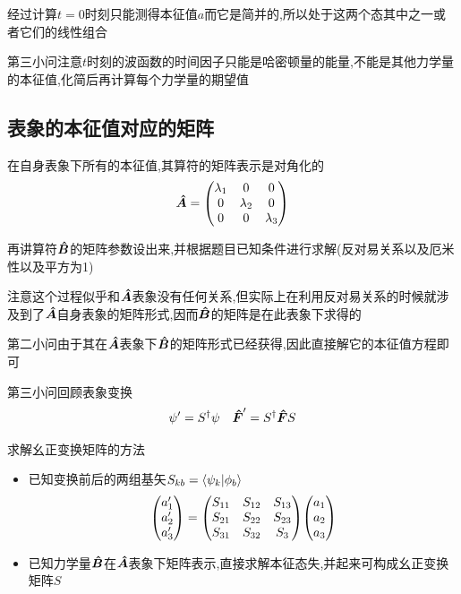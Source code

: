 \documentclass{article}
\begin{document}
            经过计算$t=0$时刻只能测得本征值$a$而它是简并的,所以处于这两个态其中之一或者它们的线性组合

            第三小问注意$t$时刻的波函数的时间因子只能是哈密顿量的能量,不能是其他力学量的本征值,化简后再计算每个力学量的期望值
        \subsection{表象的本征值对应的矩阵}
            \begin{formal}
                在自身表象下所有的本征值,其算符的矩阵表示是对角化的
                $$ \vu*{A} = \mqty (\lambda_{1} & 0 & 0 \\ 0 & \lambda_{2} & 0 \\ 0 & 0 & \lambda_{3}) $$
            \end{formal}
        
            再讲算符$\vu*{B}$的矩阵参数设出来,并根据题目已知条件进行求解(反对易关系以及厄米性以及平方为1)

            注意这个过程似乎和$\vu*{A}$表象没有任何关系,但实际上在利用反对易关系的时候就涉及到了$\vu*{A}$自身表象的矩阵形式,因而$\vu*{B}$的矩阵是在此表象下求得的

            第二小问由于其在$\vu*{A}$表象下$\vu*{B}$的矩阵形式已经获得,因此直接解它的本征值方程即可

            第三小问回顾表象变换
            $$ \psi' = S^{\dagger} \psi \quad \vu*{F}' = S^{\dagger} \vu*{F} S $$
            \begin{formal}
                
                求解幺正变换矩阵的方法
                \begin{itemize}
                    \item 已知变换前后的两组基矢$S_{kb} = \braket{\psi_{k}}{\phi_{b}} $
                    $$\mqty(a_{1}' \\ a_{2}' \\ a_{3}') = \mqty(S_{11} & S_{12} & S_{13} \\ S_{21} & S_{22} & S_{23} \\ S_{31} & S_{32} & S_{3})  \mqty(a_{1} \\ a_{2} \\ a_{3}) $$ 
                    \item 已知力学量$\vu*{B}$在$\vu*{A}$表象下矩阵表示,直接求解本征态失,并起来可构成幺正变换矩阵$S$
                \end{itemize}
            \end{formal}
\end{document}

